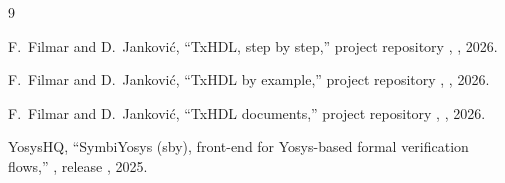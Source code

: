 \documentclass[journal,9pt]{IEEEtran}
\begin{document}
\begin{thebibliography}{9}

F.~Filmar and D.~Janković, ``TxHDL, step by step,'' project
repository , , 2026.

F.~Filmar and D.~Janković, ``TxHDL by example,'' project repository
, , 2026.

F.~Filmar and D.~Janković, ``TxHDL documents,'' project repository
, , 2026.

YosysHQ, ``SymbiYosys (sby), front-end for Yosys-based formal
verification flows,'' , release
, 2025.

\end{thebibliography}
\end{document}
